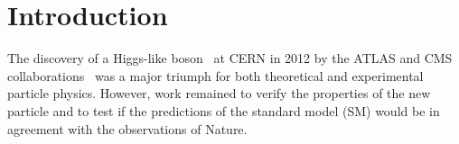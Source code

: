 \chapter{Introduction}\label{chapter:introduction}

The discovery of a Higgs-like boson~\cite{Higgs:1964ia,Higgs:1964pj,Higgs:1966ev,Englert:1964et,Guralnik:1964eu} at CERN in 2012 by the ATLAS and CMS collaborations~\cite{Aad:2012tfa,Chatrchyan:2012xdj} was a major triumph for both theoretical and experimental particle physics.
However, work remained to verify the properties of the new particle and to test if the predictions of the standard model (SM) would be in agreement with the observations of Nature.
